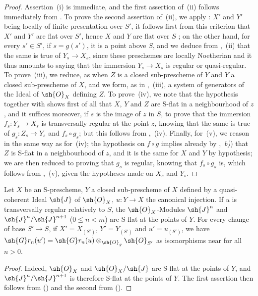 \begin{proof}
Assertion~(i) is immediate, and the first assertion of~(ii) follows immediately from .
To prove the second assertion of~(ii), we apply : $X'$ and $Y'$ being locally of finite presentation over $S'$, it follows first from this criterion that $X'$ and $Y'$ are flat over $S'$, hence $X$ and $Y$ are flat over $S$ ; on the other hand, for every $s'\in S'$, if $s=g(s')$, it is a point above $S$, and we deduce from ,~(ii) that the same is true of $Y_s\to X_s$, since these preschemes are locally Noetherian and it thus amounts to saying that the immersion $Y_s\to X_s$ is regular or quasi-regular.
To prove~(iii), we reduce, as when $Z$ is a closed sub-prescheme of $Y$ and $Y$ a closed sub-prescheme of $X$, and we form, as in ,~(iii), a system of generators of the Ideal of $\sh{O}_X$ defining $Z$.
To prove~(iv), we note that the hypothesis together with  shows first of all that $X$, $Y$ and $Z$ are S-flat in a neighbourhood of $z$, and it suffices moreover, if $s$ is the image of $z$ in $S$, to prove that the immersion $f_s:Y_s\to X_s$ is transversally regular at the point $z$, knowing that the same is true of $g_s:Z_s\to Y_s$ and $f_s\circ g_s$; but this follows from ,~(iv).
Finally, for~(v), we reason in the same way as for~(iv); the hypothesis on $f\circ g$ implies already by ,~\emph{b)}) that $Z$ is S-flat in a neighbourhood of $z$, and it is the same for $X$ and $Y$ by hypothesis; we are then reduced to proving that $g_s$ is regular, knowing that $f_s\circ g_s$ is, which follows from ,~(v), given the hypotheses made on $X_s$ and $Y_s$.
\end{proof}


\begin{proposition}[19.2.8]
\label{IV.19.2.8}
Let $X$ be an S-prescheme, $Y$ a closed sub-prescheme of $X$ defined by a quasi-coherent Ideal $\sh{J}$ of $\sh{O}_X$, $u:Y\to X$ the canonical injection.
If $u$ is transversally regular relatively to $S$, the $\sh{O}_X$-Modules $\sh{J}^n$ and $\sh{J}^n/\sh{J}^{n+1}$ ($0\leq n<m$) are S-flat at the points of $Y$.
For every change of base $S'\to S$, if $X'=X_{(S')}$, $Y'=Y_{(S')}$ and $u'=u_{(S')}$, we have $\sh{G}r_n(u')=\sh{G}r_n(u)\otimes_{\sh{O}_g}\sh{O}_{S'}$ as isomorphisms near for all $n>0$.
\end{proposition}

\begin{proof}
Indeed, $\sh{O}_X$ and $\sh{O}_X/\sh{J}$ are S-flat at the points of $Y$, and $\sh{J}^n/\sh{J}^{n+1}$ is therefore S-flat at the points of $Y$.
The first assertion then follows from () and the second from ().
\end{proof}

